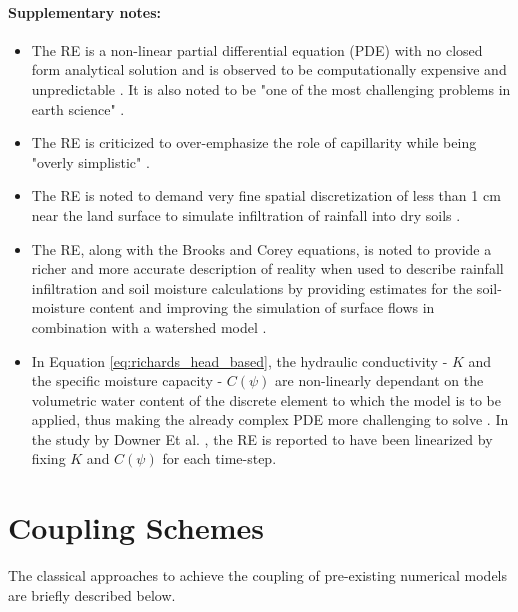\paragraph*{Supplementary notes:}
\begin{itemize}
    \item The RE is a non-linear partial differential equation (PDE) with no closed form analytical solution and is observed to be computationally expensive and unpredictable \cite{Short1995, Miller1998}. It is also noted to be "one of the most challenging problems in earth science" \cite{Farthing2017}.
    \item The RE is criticized to over-emphasize the role of capillarity \cite{Germann2010} while being "overly simplistic" \cite{Gray1991}.
    \item The RE is noted to demand very fine spatial discretization of less than 1 cm near the land surface to simulate infiltration of rainfall into dry soils \cite{Downer2004}.
    \item The RE, along with the Brooks and Corey equations, is noted to provide a richer and more accurate description of reality when used to describe rainfall infiltration and soil moisture calculations by providing estimates for the soil-moisture content and improving the simulation of surface flows in combination with a watershed model \cite{Downer2003}.
    \item In Equation \ref{eq:richards_head_based}, the hydraulic conductivity - $K$ and the specific moisture capacity - $C(\psi)$ are non-linearly dependant on the volumetric water content of the discrete element to which the model is to be applied, thus making the already complex PDE more challenging to solve \cite{Downer2004}. In the study by Downer Et al. \cite{Downer2004}, the RE is reported to have been linearized by fixing $K$ and $C(\psi)$ for each time-step.
\end{itemize}


\section{Coupling Schemes}
\label{coupling_schemes}
The classical approaches to achieve the coupling of pre-existing numerical models are briefly described below.

